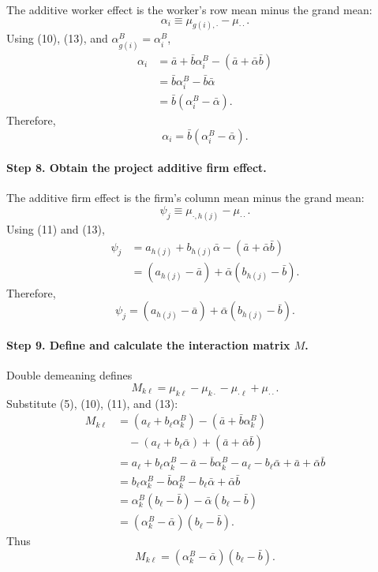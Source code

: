 \documentclass[11pt]{article}
\begin{document}
The additive worker effect is the worker's row mean minus the grand mean:
\[
\alpha_i
\equiv
\mu_{g(i),\cdot}-\mu_{\cdot\cdot}.
\tag{15}
\]
Using (10), (13), and \(\alpha_{g(i)}^B=\alpha_i^B\),
\begin{align*}
\alpha_i
&=
\bar a+\bar b\alpha_i^B
-
(\bar a+\bar\alpha\bar b)\\
&=
\bar b\alpha_i^B-\bar b\bar\alpha\\
&=
\bar b(\alpha_i^B-\bar\alpha).
\end{align*}
Therefore,
\[
\alpha_i=\bar b(\alpha_i^B-\bar\alpha).
\tag{16}
\]

\paragraph{Step 8. Obtain the project additive firm effect.}

The additive firm effect is the firm's column mean minus the grand mean:
\[
\psi_j
\equiv
\mu_{\cdot,h(j)}-\mu_{\cdot\cdot}.
\tag{17}
\]
Using (11) and (13),
\begin{align*}
\psi_j
&=
a_{h(j)}+b_{h(j)}\bar\alpha
-
(\bar a+\bar\alpha\bar b)\\
&=
(a_{h(j)}-\bar a)
+
\bar\alpha(b_{h(j)}-\bar b).
\end{align*}
Therefore,
\[
\psi_j
=
(a_{h(j)}-\bar a)
+
\bar\alpha(b_{h(j)}-\bar b).
\tag{18}
\]

\paragraph{Step 9. Define and calculate the interaction matrix \(M\).}

Double demeaning defines
\[
M_{k\ell}
=
\mu_{k\ell}
-
\mu_{k\cdot}
-
\mu_{\cdot\ell}
+
\mu_{\cdot\cdot}.
\tag{19}
\]
Substitute (5), (10), (11), and (13):
\begin{align*}
M_{k\ell}
&=
(a_\ell+b_\ell\alpha_k^B)
-
(\bar a+\bar b\alpha_k^B)\\
&\quad
-
(a_\ell+b_\ell\bar\alpha)
+
(\bar a+\bar\alpha\bar b)\\
&=
a_\ell+b_\ell\alpha_k^B
-
\bar a-\bar b\alpha_k^B
-
a_\ell-b_\ell\bar\alpha
+
\bar a+\bar\alpha\bar b\\
&=
b_\ell\alpha_k^B
-
\bar b\alpha_k^B
-
b_\ell\bar\alpha
+
\bar\alpha\bar b\\
&=
\alpha_k^B(b_\ell-\bar b)
-
\bar\alpha(b_\ell-\bar b)\\
&=
(\alpha_k^B-\bar\alpha)(b_\ell-\bar b).
\end{align*}
Thus
\[
M_{k\ell}
=
(\alpha_k^B-\bar\alpha)(b_\ell-\bar b).
\tag{20}
\]
\end{document}
